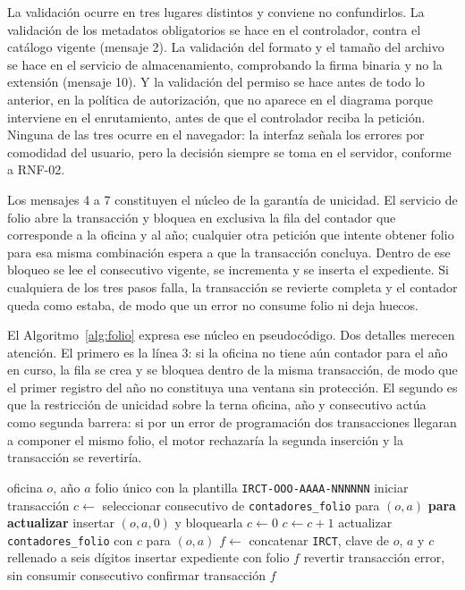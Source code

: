 La validación ocurre en tres lugares distintos y conviene no confundirlos. La validación de los metadatos obligatorios se hace en el controlador, contra el catálogo vigente (mensaje 2). La validación del formato y el tamaño del archivo se hace en el servicio de almacenamiento, comprobando la firma binaria y no la extensión (mensaje 10). Y la validación del permiso se hace antes de todo lo anterior, en la política de autorización, que no aparece en el diagrama porque interviene en el enrutamiento, antes de que el controlador reciba la petición. Ninguna de las tres ocurre en el navegador: la interfaz señala los errores por comodidad del usuario, pero la decisión siempre se toma en el servidor, conforme a RNF-02.

Los mensajes 4 a 7 constituyen el núcleo de la garantía de unicidad. El servicio de folio abre la transacción y bloquea en exclusiva la fila del contador que corresponde a la oficina y al año; cualquier otra petición que intente obtener folio para esa misma combinación espera a que la transacción concluya. Dentro de ese bloqueo se lee el consecutivo vigente, se incrementa y se inserta el expediente. Si cualquiera de los tres pasos falla, la transacción se revierte completa y el contador queda como estaba, de modo que un error no consume folio ni deja huecos.

El Algoritmo~\ref{alg:folio} expresa ese núcleo en pseudocódigo. Dos detalles merecen atención. El primero es la línea 3: si la oficina no tiene aún contador para el año en curso, la fila se crea y se bloquea dentro de la misma transacción, de modo que el primer registro del año no constituya una ventana sin protección. El segundo es que la restricción de unicidad sobre la terna oficina, año y consecutivo actúa como segunda barrera: si por un error de programación dos transacciones llegaran a componer el mismo folio, el motor rechazaría la segunda inserción y la transacción se revertiría.

\begin{algorithm}[H]
\caption{Asignación del folio institucional}
\label{alg:folio}
\begin{algorithmic}[1]
\Require oficina $o$, año $a$
\Ensure folio único con la plantilla \texttt{IRCT-OOO-AAAA-NNNNNN}
\State iniciar transacción
\State $c \gets$ seleccionar consecutivo de \texttt{contadores\_folio} para $(o,a)$ \textbf{para actualizar}
  \State insertar $(o, a, 0)$ y bloquearla
  \State $c \gets 0$
\EndIf
\State $c \gets c + 1$
\State actualizar \texttt{contadores\_folio} con $c$ para $(o,a)$
\State $f \gets$ concatenar \texttt{IRCT}, clave de $o$, $a$ y $c$ rellenado a seis dígitos
\State insertar expediente con folio $f$
  \State revertir transacción
  \State \Return error, sin consumir consecutivo
\EndIf
\State confirmar transacción
\State \Return $f$
\end{algorithmic}
\end{algorithm}

